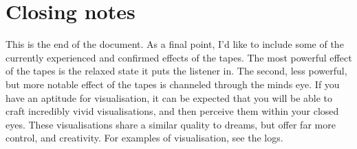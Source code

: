 \documentclass{article}
\begin{document}
\section{Closing notes}
This is the end of the document. As a final point, I'd like to include some of the currently experienced and confirmed effects of the tapes. The most powerful effect of the tapes is the relaxed state it puts the listener in. The second, less powerful, but more notable effect of the tapes is channeled through the minds eye. If you have an aptitude for visualisation, it can be expected that you will be able to craft incredibly vivid visualisations, and then perceive them within your closed eyes. These visualisations share a similar quality to dreams, but offer far more control, and creativity. For examples of visualisation, see the logs.
\end{document}
